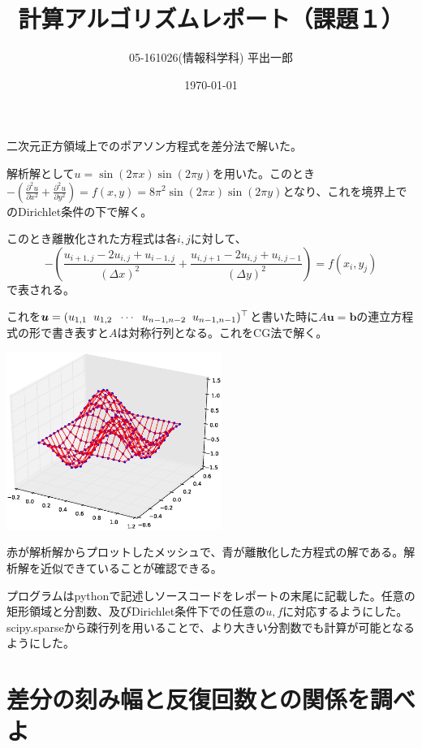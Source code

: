 \documentclass[a4j]{jarticle}
\title{計算アルゴリズムレポート（課題１）}
\author{05-161026(情報科学科) 平出一郎}
\date{\today}
\let \ds \displaystyle
\newcommand{\pdiff}[3]{
  \frac{\partial^{#1} #2}{\partial #3^{#1}}
}
\begin{document}
\thispagestyle{empty}
\maketitle
\pagebreak




二次元正方領域上でのポアソン方程式を差分法で解いた。


解析解として$\ds u=\sin(2\pi x)\sin(2\pi y)$を用いた。このとき$\ds - \left( \pdiff{2}{u}{x}+\pdiff{2}{u}{y} \right)= f(x,y) = 8\pi^2\sin(2\pi x)\sin(2\pi y)$となり、これを境界上でのDirichlet条件の下で解く。


このとき離散化された方程式は各$i,j$に対して、$$\ds - \left( \frac{u_{i+1,j}-2u_{i,j}+u_{i-1,j}}{(\Delta x)^2}+\frac{u_{i,j+1}-2u_{i,j}+u_{i,j-1}}{(\Delta y)^2} \right) = f(x_i,y_j)$$で表される。


これを$\ds {\bm u} = (u_{1,1}\hspace{2mm}u_{1,2}\hspace{2mm}\cdots\hspace{2mm}u_{n-1,n-2}\hspace{2mm}u_{n-1,n-1})^\top$と書いた時に$A{\bm u}={\bm b}$の連立方程式の形で書き表すと$A$は対称行列となる。これをCG法で解く。

\includegraphics[width=7cm]{3D.eps}


赤が解析解からプロットしたメッシュで、青が離散化した方程式の解である。解析解を近似できていることが確認できる。


プログラムはpythonで記述しソースコードをレポートの末尾に記載した。任意の矩形領域と分割数、及びDirichlet条件下での任意の$u,f$に対応するようにした。scipy.sparseから疎行列を用いることで、より大きい分割数でも計算が可能となるようにした。



\section{差分の刻み幅と反復回数との関係を調べよ}
\end{document}
